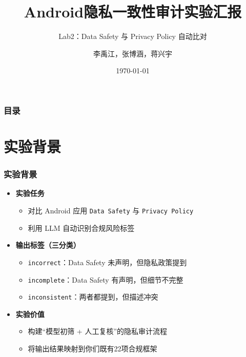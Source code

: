 \documentclass[AutoFakeBold,AutoFakeSlant]{beamer}
\author{李禹江，张博涵，蒋兴宇}
\title{Android隐私一致性审计实验汇报}
\subtitle{Lab2：Data Safety 与 Privacy Policy 自动比对}
\institute{我的刀盾队}
\date{\today}
\begin{document}
\kaishu

\begin{frame}
    \titlepage
\end{frame}

\begin{frame}
    \frametitle{目录}
    \tableofcontents
\end{frame}

\section{实验背景}
\begin{frame}
    \frametitle{实验背景}
    \begin{itemize}
        \item \textbf{实验任务}
        \begin{itemize}
            \item 对比 Android 应用 \texttt{Data Safety} 与 \texttt{Privacy Policy}
            \item 利用 LLM 自动识别合规风险标签
        \end{itemize}
        \item \textbf{输出标签（三分类）}
        \begin{itemize}
            \item \texttt{incorrect}：Data Safety 未声明，但隐私政策提到
            \item \texttt{incomplete}：Data Safety 有声明，但细节不完整
            \item \texttt{inconsistent}：两者都提到，但描述冲突
        \end{itemize}
        \item \textbf{实验价值}
        \begin{itemize}
            \item 构建“模型初筛 + 人工复核”的隐私审计流程
            \item 将输出结果映射到你们既有22项合规框架
        \end{itemize}
    \end{itemize}
\end{frame}
\end{document}

